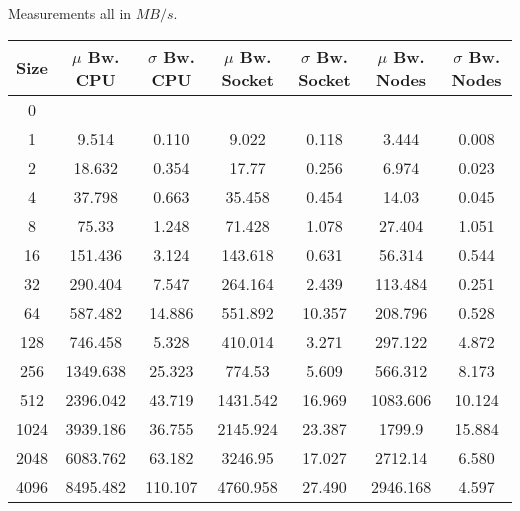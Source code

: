 \documentclass[UTF-8]{article}
\begin{document}
\begin{table}
	\centering
	Measurements all in $MB/s$.
	\begin{tabular}{|c|c|c|c|c|c|c|} 
		\hline
		Size    & $\mu$ Bw. CPU & $\sigma$ Bw. CPU & $\mu$ Bw. Socket & $\sigma$ Bw. Socket & $\mu$ Bw. Nodes & $\sigma$ Bw. Nodes  \\ 
		\hline
		0       &             &              &                &                 &               &                 \\ 
		\hline
		1       & 9.514       & 0.110        & 9.022          & 0.118           & 3.444         & 0.008           \\ 
		\hline
		2       & 18.632      & 0.354        & 17.77          & 0.256           & 6.974         & 0.023           \\ 
		\hline
		4       & 37.798      & 0.663        & 35.458         & 0.454           & 14.03         & 0.045           \\ 
		\hline
		8       & 75.33       & 1.248        & 71.428         & 1.078           & 27.404        & 1.051           \\ 
		\hline
		16      & 151.436     & 3.124        & 143.618        & 0.631           & 56.314        & 0.544           \\ 
		\hline
		32      & 290.404     & 7.547        & 264.164        & 2.439           & 113.484       & 0.251           \\ 
		\hline
		64      & 587.482     & 14.886       & 551.892        & 10.357          & 208.796       & 0.528           \\ 
		\hline
		128     & 746.458     & 5.328        & 410.014        & 3.271           & 297.122       & 4.872           \\ 
		\hline
		256     & 1349.638    & 25.323       & 774.53         & 5.609           & 566.312       & 8.173           \\ 
		\hline
		512     & 2396.042    & 43.719       & 1431.542       & 16.969          & 1083.606      & 10.124          \\ 
		\hline
		1024    & 3939.186    & 36.755       & 2145.924       & 23.387          & 1799.9        & 15.884          \\ 
		\hline
		2048    & 6083.762    & 63.182       & 3246.95        & 17.027          & 2712.14       & 6.580           \\ 
		\hline
		4096    & 8495.482    & 110.107      & 4760.958       & 27.490          & 2946.168      & 4.597           \\ 

\end{tabular}
\end{table}
\end{document}
